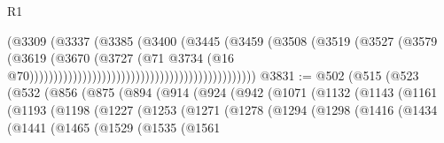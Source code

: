 \begin{lexlean}{R1}
\begin{coremodule}
                                                                    (@3309
                                                                      (@3337
                                                                        (@3385
                                                                          (@3400
                                                                            (@3445
                                                                              (@3459
                                                                                (@3508
                                                                                  (@3519
                                                                                    (@3527
                                                                                      (@3579
                                                                                        (@3619
                                                                                          (@3670
                                                                                            (@3727
                                                                                              (@71
                                                                                                @3734
                                                                                                (@16
                                                                                                  @70)))))))))))))))))))))))))))))))))))))))))))))))
@3831 := @502
    (@515
      (@523
        (@532
          (@856
            (@875
              (@894
                (@914
                  (@924
                    (@942
                      (@1071
                        (@1132
                          (@1143
                            (@1161
                              (@1193
                                (@1198
                                  (@1227
                                    (@1253
                                      (@1271
                                        (@1278
                                          (@1294
                                            (@1298
                                              (@1416
                                                (@1434
                                                  (@1441
                                                    (@1465
                                                      (@1529
                                                        (@1535
                                                          (@1561

\end{coremodule}
\end{lexlean}
